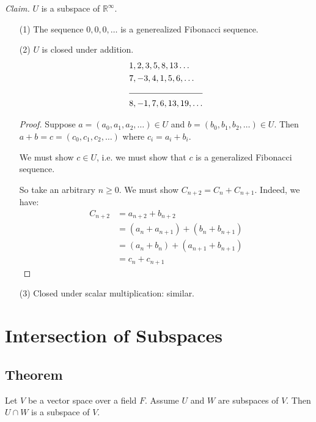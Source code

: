 \documentclass[11pt]{article}
\begin{document}
\begin{enumerate}
        \emph{Claim.} $U$ is a subspace of \(\mathbb{R}^{\infty}\).
        \begin{enumerate}
            \item[(1)] The sequence \(0,0,0, \dots\) is a generealized Fibonacci sequence.
            \item[(2)] $U$ is closed under addition.
            \begin{align*}
                & 1,2,3,5,8,13 \dots \\
                & 7, -3,4,1,5,6, \dots \\
                \cline{1-2}
                & 8,-1,7,6,13,19, \dots
            \end{align*}
            \begin{proof}
                Suppose \(a = (a_0, a_1, a_2, \dots) \in U\) and \(b = (b_0, b_1, b_2, \dots) \in U.\) Then \(a + b = c = (c_0, c_1, c_2, \dots)\) where \(c_i = a_i + b_i.\) 

                We must show \(c \in U\), i.e. we must show that $c$ is a generalized Fibonacci sequence.

                So take an arbitrary \(n \geq 0\). We must show \(C_{n+2} = C_n + C_{n+1}\). Indeed, we have:
                \begin{align*}
                    C_{n+2} &= a_{n+2} + b_{n+2} \\
                            &= (a_n + a_{n+1}) + (b_n + b_{n+1}) \\
                            &= (a_n + b_n) + (a_{n+1} + b_{n+1}) \\
                            &= c_n + c_{n+1}
                \end{align*}
            \end{proof}
            \item[(3)] Closed under scalar multiplication: similar.
        \end{enumerate}
    \end{enumerate}

    \section{Intersection of Subspaces}

    \subsection{Theorem}

    Let $V$ be a vector space over a field $F$. Assume $U$ and $W$ are subspaces of $V$. Then \(U \cap W\) is a subspace of $V$.
\end{document}
